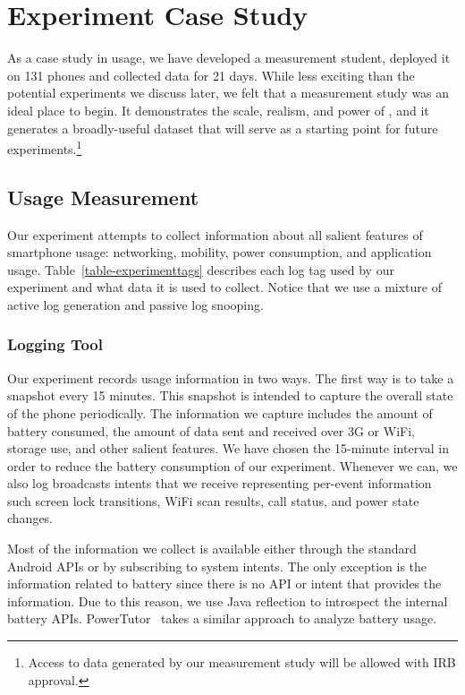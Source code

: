 \section{Experiment Case Study}
\label{sec-experiment}




As a case study in \PhoneLab{} usage, we have developed a measurement
student, deployed it on 131 phones and collected data for 21 days. While less
exciting than the potential experiments we discuss later, we felt that a
measurement study was an ideal place to begin. It demonstrates the scale,
realism, and power of \PhoneLab{}, and it generates a broadly-useful dataset
that will serve as a starting point for future experiments.\footnote{Access
to data generated by our measurement study will be allowed with IRB
approval.}

\subsection{Usage Measurement}

Our experiment attempts to collect information about all salient features of
smartphone usage: networking, mobility, power consumption, and application
usage. Table~\ref{table-experimenttags} describes each log tag used by our
experiment and what data it is used to collect. Notice that we use a mixture
of active log generation and passive log snooping.

\subsubsection{Logging Tool}

Our experiment records usage information in two ways. The first way is to
take a snapshot every 15 minutes. This snapshot is intended to capture the
overall state of the phone periodically. The information we capture includes
the amount of battery consumed, the amount of data sent and received over 3G
or WiFi, storage use, and other salient features. We have chosen the
15-minute interval in order to reduce the battery consumption of our
experiment. Whenever we can, we also log broadcasts intents that we receive
representing per-event information such screen lock transitions, WiFi scan
results, call status, and power state changes.

Most of the information we collect is available either through the standard
Android APIs or by subscribing to system intents. The only exception is the
information related to battery since there is no API or intent that provides
the information. Due to this reason, we use Java reflection to introspect the
internal battery APIs. PowerTutor~\cite{zhang:codes:2010} takes a similar
approach to analyze battery usage.

